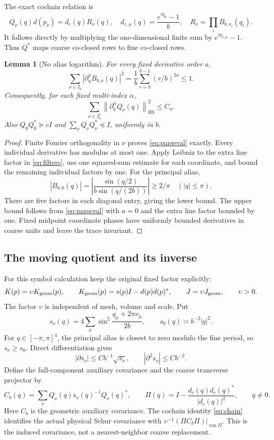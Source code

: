 \documentclass[11pt,letterpaper]{article}
\newtheorem{lemma}[theorem]{Lemma}
\theoremstyle{remark}\newtheorem{remark}[theorem]{Remark}
\newcommand{\norm}[1]{\left\lVert#1\right\rVert}
\begin{document}
The exact cochain relation is
\begin{equation}\label{eq:chain}
 Q_\nu(q)d(p_\nu)=d_c(q)R_\nu(q),\quad
 d_{c,\mu}(q)=\frac{e^{iq_\mu}-1}{b},\quad
 R_\nu=\prod_iB_{b,\nu_i}(q_i).
\end{equation}
It follows directly by multiplying the one-dimensional finite sum by \(e^{ip_{\nu,\mu}}-1\). Thus \(Q^*\) maps coarse co-closed rows to fine co-closed rows.

\begin{lemma}[No alias logarithm]\label{lem:filters}
For every fixed derivative order \(a\),
\begin{equation}\label{eq:parseval}
 \sum_{\nu\in I_b}|\partial_q^aB_{b,\nu}(q)|^2
 =\frac1b\sum_{r=0}^{b-1}(r/b)^{2a}\le1.
\end{equation}
Consequently, for each fixed multi-index \(\alpha\),
\[
 \sum_{\nu\in I_b^4}\norm{\partial_q^\alpha Q_\nu(q)}_{\mathrm{HS}}^2\le C_\alpha.
\]
Also \(Q_0Q_0^*\succeq cI\) and \(\sum_\nu Q_\nu Q_\nu^*\preceq I\), uniformly in \(b\).
\end{lemma}
\begin{proof}
Finite Fourier orthogonality in \(\nu\) proves \eqref{eq:parseval} exactly. Every individual derivative has modulus at most one. Apply Leibniz to the extra line factor in \eqref{eq:filters}, use one squared-sum estimate for each coordinate, and bound the remaining individual factors by one. For the principal alias,
\[
 |B_{b,0}(q)|=\left|\frac{\sin(q/2)}{b\sin(q/(2b))}\right|\ge2/\pi
 \quad(|q|\le\pi).
\]
There are five factors in each diagonal entry, giving the lower bound. The upper bound follows from \eqref{eq:parseval} with \(a=0\) and the extra line factor bounded by one. Fixed midpoint coordinate phases have uniformly bounded derivatives in coarse units and leave the trace invariant.
\end{proof}

\subsection{The moving quotient and its inverse}

For this symbol calculation keep the original fixed factor explicitly:
\[
 K(p)=\upsilon K_{\rm geom}(p),\qquad
 K_{\rm geom}(p)=s(p)I-d(p)d(p)^*,\qquad
 J=\upsilon J_{\rm geom},\qquad \upsilon>0.
\]
The factor \(\upsilon\) is independent of mesh, volume and scale. Put
\[
 s_\nu(q)=4\sum_\mu\sin^2\frac{q_\mu+2\pi\nu_\mu}{2b},
 \qquad s_0(q)\asymp b^{-2}|q|^2.
\]
For \(q\in[-\pi,\pi]^4\), the principal alias is closest to zero modulo the fine period, so \(s_\nu\ge s_0\). Direct differentiation gives
\[
 |\partial s_\nu|\le Cb^{-1}\sqrt{s_\nu},\qquad
 |\partial^2s_\nu|\le Cb^{-2}.
\]
Define the full-component auxiliary covariance and the coarse transverse projector by
\[
 C_b(q)=\sum_\nu Q_\nu(q)s_\nu(q)^{-1}Q_\nu(q)^*,\qquad
 \Pi(q)=I-\frac{d_c(q)d_c(q)^*}{|d_c(q)|^2},\qquad q\ne0.
\]
Here \(C_b\) is the geometric auxiliary covariance. The cochain identity \eqref{eq:chain} identifies the actual physical Schur covariance with \(\upsilon^{-1}(\Pi C_b\Pi)|_{\operatorname{ran}\Pi}\). This is the induced covariance, not a nearest-neighbor coarse replacement.
\end{document}
